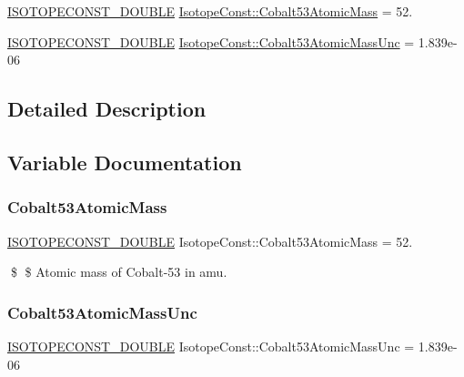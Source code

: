 \begin{DoxyCompactItemize}
\item 
\mbox{\hyperlink{group___isotope_const-_macros_ga8f45a7272ce02c0b4c65c44636ed719a}{I\+S\+O\+T\+O\+P\+E\+C\+O\+N\+S\+T\+\_\+\+D\+O\+U\+B\+LE}} \mbox{\hyperlink{group___isotope_const-_cobalt-_co53_ga9d01d225b28818927e30a30f11838a9b}{Isotope\+Const\+::\+Cobalt53\+Atomic\+Mass}} = 52.
\item 
\mbox{\hyperlink{group___isotope_const-_macros_ga8f45a7272ce02c0b4c65c44636ed719a}{I\+S\+O\+T\+O\+P\+E\+C\+O\+N\+S\+T\+\_\+\+D\+O\+U\+B\+LE}} \mbox{\hyperlink{group___isotope_const-_cobalt-_co53_gaa258b94a42b7ff492cd4fe85fae7878b}{Isotope\+Const\+::\+Cobalt53\+Atomic\+Mass\+Unc}} = 1.\+839e-\/06
\end{DoxyCompactItemize}


\subsection{Detailed Description}


\subsection{Variable Documentation}
\mbox{\label{group___isotope_const-_cobalt-_co53_ga9d01d225b28818927e30a30f11838a9b}} 
\subsubsection{\texorpdfstring{Cobalt53\+Atomic\+Mass}{Cobalt53AtomicMass}}
{\footnotesize\ttfamily \mbox{\hyperlink{group___isotope_const-_macros_ga8f45a7272ce02c0b4c65c44636ed719a}{I\+S\+O\+T\+O\+P\+E\+C\+O\+N\+S\+T\+\_\+\+D\+O\+U\+B\+LE}} Isotope\+Const\+::\+Cobalt53\+Atomic\+Mass = 52.}

\$ \$ Atomic mass of Cobalt-\/53 in amu. \mbox{\label{group___isotope_const-_cobalt-_co53_gaa258b94a42b7ff492cd4fe85fae7878b}} 
\subsubsection{\texorpdfstring{Cobalt53\+Atomic\+Mass\+Unc}{Cobalt53AtomicMassUnc}}
{\footnotesize\ttfamily \mbox{\hyperlink{group___isotope_const-_macros_ga8f45a7272ce02c0b4c65c44636ed719a}{I\+S\+O\+T\+O\+P\+E\+C\+O\+N\+S\+T\+\_\+\+D\+O\+U\+B\+LE}} Isotope\+Const\+::\+Cobalt53\+Atomic\+Mass\+Unc = 1.\+839e-\/06}

